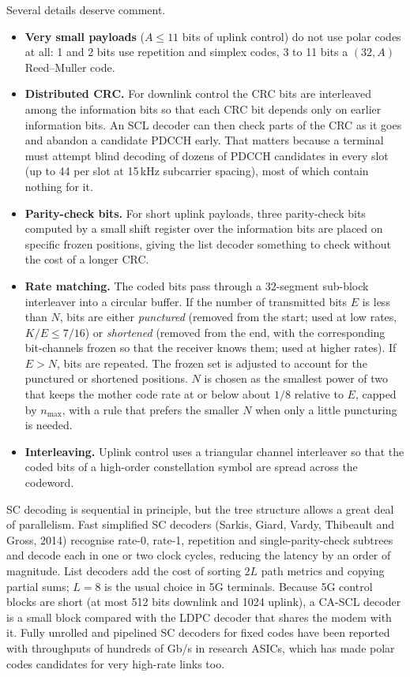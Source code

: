 Several details deserve comment.
\begin{itemize}
\item \textbf{Very small payloads} ($A\le11$ bits of uplink control) do not use polar codes at all:
1 and 2 bits use repetition and simplex codes, 3 to 11 bits a $(32,A)$ Reed--Muller code.
\item \textbf{Distributed CRC.} For downlink control the CRC bits are interleaved among the information
bits so that each CRC bit depends only on earlier information bits. An SCL decoder can then check
parts of the CRC as it goes and abandon a candidate PDCCH early. That matters because a terminal
must attempt blind decoding of dozens of PDCCH candidates in every slot (up to 44 per slot at
15\,kHz subcarrier spacing), most of which contain nothing for it.
\item \textbf{Parity-check bits.} For short uplink payloads, three parity-check bits computed by a
small shift register over the information bits are placed on specific frozen positions, giving the
list decoder something to check without the cost of a longer CRC.
\item \textbf{Rate matching.} The coded bits pass through a 32-segment sub-block interleaver into a
circular buffer. If the number of transmitted bits $E$ is less than $N$, bits are either
\emph{punctured} (removed from the start; used at low rates, $K/E\le7/16$) or \emph{shortened}
(removed from the end, with the corresponding bit-channels frozen so that the receiver knows them;
used at higher rates). If $E>N$, bits are repeated. The frozen set is adjusted to account for the
punctured or shortened positions. $N$ is chosen as the smallest power of two that keeps the mother
code rate at or below about $1/8$ relative to $E$, capped by $n_{\max}$, with a rule that prefers the
smaller $N$ when only a little puncturing is needed.
\item \textbf{Interleaving.} Uplink control uses a triangular channel interleaver so that the coded
bits of a high-order constellation symbol are spread across the codeword.
\end{itemize}

\begin{inpractice}
SC decoding is sequential in principle, but the tree structure allows a great deal of parallelism.
Fast simplified SC decoders (Sarkis, Giard, Vardy, Thibeault and Gross, 2014) recognise rate-0,
rate-1, repetition and single-parity-check subtrees and decode each in one or two clock cycles,
reducing the latency by an order of magnitude. List decoders add the cost of sorting $2L$ path metrics
and copying partial sums; $L=8$ is the usual choice in 5G terminals. Because 5G control blocks are
short (at most 512 bits downlink and 1024 uplink), a CA-SCL decoder is a small block compared with the
LDPC decoder that shares the modem with it. Fully unrolled and pipelined SC decoders for fixed codes
have been reported with throughputs of hundreds of Gb/s in research ASICs, which has made polar codes
candidates for very high-rate links too.
\end{inpractice}

